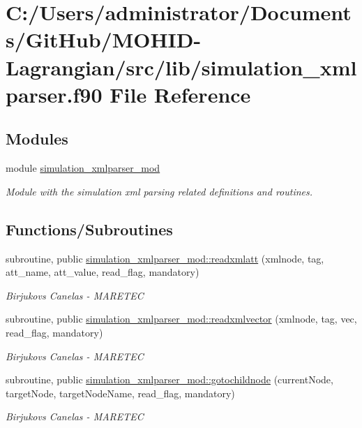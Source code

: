 \hypertarget{simulation__xmlparser_8f90}{}\section{C\+:/\+Users/administrator/\+Documents/\+Git\+Hub/\+M\+O\+H\+I\+D-\/\+Lagrangian/src/lib/simulation\+\_\+xmlparser.f90 File Reference}
\label{simulation__xmlparser_8f90}
\subsection*{Modules}
\begin{DoxyCompactItemize}
\item 
module \hyperlink{namespacesimulation__xmlparser__mod}{simulation\+\_\+xmlparser\+\_\+mod}
\begin{DoxyCompactList}\small\item\em Module with the simulation xml parsing related definitions and routines. \end{DoxyCompactList}\end{DoxyCompactItemize}
\subsection*{Functions/\+Subroutines}
\begin{DoxyCompactItemize}
\item 
subroutine, public \hyperlink{namespacesimulation__xmlparser__mod_ab062c8e064b043446d4f6ac695b306ab}{simulation\+\_\+xmlparser\+\_\+mod\+::readxmlatt} (xmlnode, tag, att\+\_\+name, att\+\_\+value, read\+\_\+flag, mandatory)
\begin{DoxyCompactList}\small\item\em Birjukovs Canelas -\/ M\+A\+R\+E\+T\+EC \end{DoxyCompactList}\item 
subroutine, public \hyperlink{namespacesimulation__xmlparser__mod_a48bcd153bef2149410d66842b564728d}{simulation\+\_\+xmlparser\+\_\+mod\+::readxmlvector} (xmlnode, tag, vec, read\+\_\+flag, mandatory)
\begin{DoxyCompactList}\small\item\em Birjukovs Canelas -\/ M\+A\+R\+E\+T\+EC \end{DoxyCompactList}\item 
subroutine, public \hyperlink{namespacesimulation__xmlparser__mod_a3167fcb99b40cdc25d2ba18418bd8b9f}{simulation\+\_\+xmlparser\+\_\+mod\+::gotochildnode} (current\+Node, target\+Node, target\+Node\+Name, read\+\_\+flag, mandatory)
\begin{DoxyCompactList}\small\item\em Birjukovs Canelas -\/ M\+A\+R\+E\+T\+EC \end{DoxyCompactList}\end{DoxyCompactItemize}
